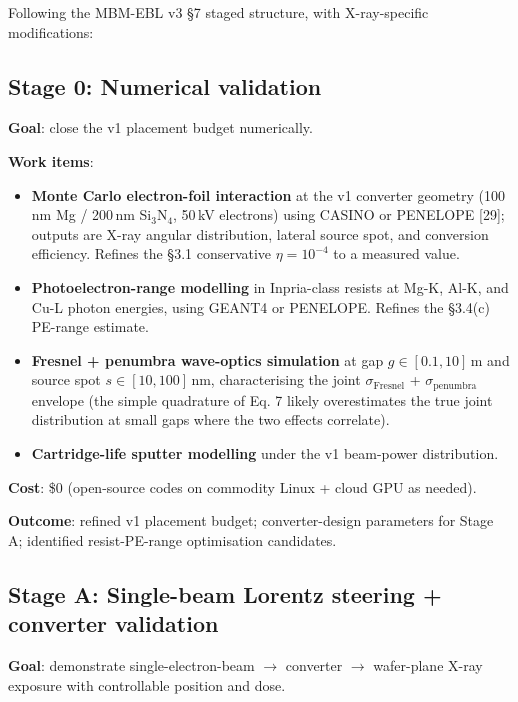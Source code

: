 \documentclass[11pt,letterpaper]{article}
\begin{document}
Following the MBM-EBL v3 \S 7 staged structure, with X-ray-specific modifications:

\subsection{Stage 0: Numerical validation}

\textbf{Goal}: close the v1 placement budget numerically.

\textbf{Work items}:
\begin{itemize}[leftmargin=1.6em]
  \item \textbf{Monte Carlo electron-foil interaction} at the v1 converter geometry (100\,nm Mg / 200\,nm Si$_3$N$_4$, 50\,kV electrons) using CASINO or PENELOPE [29]; outputs are X-ray angular distribution, lateral source spot, and conversion efficiency. Refines the \S 3.1 conservative $\eta = 10^{-4}$ to a measured value.
  \item \textbf{Photoelectron-range modelling} in Inpria-class resists at Mg-K, Al-K, and Cu-L photon energies, using GEANT4 or PENELOPE. Refines the \S 3.4(c) PE-range estimate.
  \item \textbf{Fresnel + penumbra wave-optics simulation} at gap $g \in [0.1, 10]$\,\textmu m and source spot $s \in [10, 100]$\,nm, characterising the joint $\sigma_\text{Fresnel}$ + $\sigma_\text{penumbra}$ envelope (the simple quadrature of Eq. 7 likely overestimates the true joint distribution at small gaps where the two effects correlate).
  \item \textbf{Cartridge-life sputter modelling} under the v1 beam-power distribution.
\end{itemize}

\textbf{Cost}: \$0 (open-source codes on commodity Linux + cloud GPU as needed).

\textbf{Outcome}: refined v1 placement budget; converter-design parameters for Stage A; identified resist-PE-range optimisation candidates.

\subsection{Stage A: Single-beam Lorentz steering + converter validation}

\textbf{Goal}: demonstrate single-electron-beam $\to$ converter $\to$ wafer-plane X-ray exposure with controllable position and dose.
\end{document}
